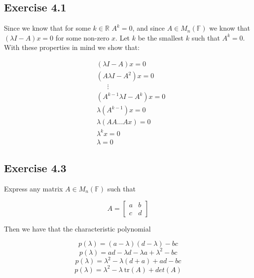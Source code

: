 \documentclass[letterpaper,12pt]{article}
\theoremstyle{definition}
\begin{document}
\subsection*{Exercise 4.1}
Since we know that for some $k \in \mathbb{R}$ $A^{k} = 0$, and since $A \in M_{n}(\mathbb{F})$ we know that $(\lambda I - A)x = 0$ for some non-zero $x$. Let $k$ be the smallest $k$ such that $A^{k} = 0$. With these properties in mind we show that:

\begin{align*}
&(\lambda I - A)x = 0\\
&(A \lambda I - A^{2})x = 0\\
&~~~~~~~\vdots\\
&(A^{k-1} \lambda I - A^{k})x = 0\\
&\lambda(A^{k-1})x = 0\\
&\lambda(AA...Ax) = 0\\
&\lambda^{k}x = 0\\
&\lambda = 0
\end{align*}

\subsection*{Exercise 4.3}

Express any matrix $A \in M_n(\mathbb{F})$ such that

\[ A = \begin{bmatrix}
    a & b \\
    c & d
    \end{bmatrix} \]

Then we have that the characteristic polynomial 

\[p(\lambda) = (a-\lambda)(d-\lambda) - bc\]
\[p(\lambda) = ad - \lambda d - \lambda a + \lambda^2 - bc\]
\[p(\lambda) = \lambda^2 - \lambda (d + a)+ ad - bc \]
\[p(\lambda) = \lambda^2 - \lambda ~\textrm{tr}(A) + det(A) \]
\end{document}

